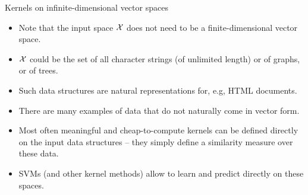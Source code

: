\documentclass[11pt,compress,t,notes=noshow, xcolor=table]{beamer}
\begin{document}
\begin{vbframe}{Kernels on infinite-dimensional vector spaces}

  \begin{itemize}
    \item Note that the input space $\mathcal{X}$ does not need to be a finite-dimensional
    vector space.
    \item $\mathcal{X}$ could be the set of all character strings (of unlimited length) or 
       of graphs, or of trees.
    \item Such data structures are natural representations for, e.g, HTML documents.
    \item There are many examples of data that do not naturally come in vector
    form.
    \item Most often meaningful and cheap-to-compute kernels can be defined
    directly on the input data structures -- they simply define a similarity measure over these data.
    \item SVMs (and other kernel methods) allow to learn and predict
    directly on these spaces.
  \end{itemize}


\end{vbframe}


\endlecture
\end{document}

